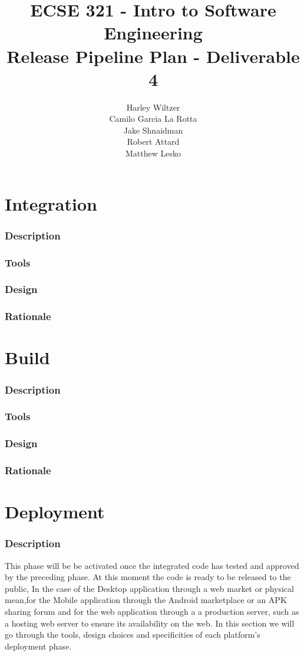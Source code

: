 \documentclass[12pt]{report}
\title{ECSE 321 - Intro to Software Engineering\\Release Pipeline Plan - Deliverable 4}
\author{Harley Wiltzer\\Camilo Garcia La Rotta\\Jake Shnaidman\\Robert Attard\\Matthew Lesko}
\date
\begin{document}
\maketitle
\newpage
{} %
\tableofcontents
\part{Integration}
\section{Description}
\section{Tools}
\section{Design}
\section{Rationale}
\part{Build}
\section{Description}
\section{Tools}
\section{Design}
\section{Rationale}
\part{Deployment}
\section{Description}
This phase will be be activated once the integrated code has tested and approved by the preceding phase. At this moment the code is ready to be released to the public, In the case of the Desktop application through a web market or physical mean,for the Mobile application through the Android marketplace or an APK sharing forum and for the web application through a a production server, such as a hosting web server to ensure its availability on the web. In this section we will go through the tools, design choices and specificities of each platform's deployment phase.
\end{document}
